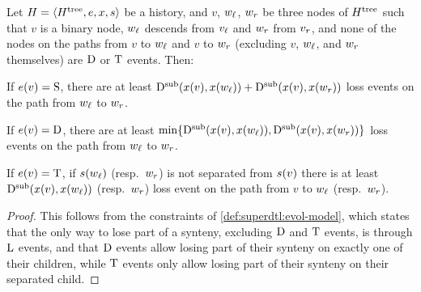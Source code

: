 \begin{lemma}\label{lem:superdtl:history-min-loss}
    Let \(H = \left\langle H^\mathrm{tree}, e, x, s\right\rangle\) be a history, and \(v\), \(w_\mathit{\ell}\), \(w_r\) be three nodes of \(H^\mathrm{tree}\) such that \(v\) is a binary node, \(w_\mathit{\ell}\) descends from \(v_\mathit{\ell}\) and \(w_r\) from \(v_r\), and none of the nodes on the paths from \(v\) to \(w_\mathit{\ell}\) and \(v\) to \(w_r\) (excluding \(v\), \(w_\mathit{\ell}\), and \(w_r\) themselves) are \(\mathrm{D}\) or \(\mathrm{T}\) events.
    Then:
    \begin{condition}
        \item\label{lem:superdtl:history-min-loss-spe}
        If \(e(v) = \mathrm{S}\), there are at least \(\mathrm{D}^\mathrm{sub}(x(v), x(w_\mathit{\ell})) + \mathrm{D}^\mathrm{sub}(x(v), x(w_r))\) loss events on the path from \(w_\mathit{\ell}\) to \(w_r\).
        \item\label{lem:superdtl:history-min-loss-dup}
        If \(e(v) = \mathrm{D}\), there are at least \(\min\{\mathrm{D}^\mathrm{sub}(x(v), x(w_\mathit{\ell})), \mathrm{D}^\mathrm{sub}(x(v), x(w_r))\}\) loss events on the path from \(w_\mathit{\ell}\) to \(w_r\).
        \item\label{lem:superdtl:history-min-loss-hgt}
        If \(e(v) = \mathrm{T}\), if \(s(w_\mathit{\ell})\) (resp.~\(w_r\)) is not separated from \(s(v)\) there is at least \(\mathrm{D}^\mathrm{sub}(x(v), x(w_\mathit{\ell}))\) (resp.~\(w_r\)) loss event on the path from \(v\) to \(w_\mathit{\ell}\) (resp.~\(w_r\)).
    \end{condition}
\end{lemma}
\begin{proof}
    This follows from the constraints of \cref{def:superdtl:evol-model}, which states that the only way to lose part of a synteny, excluding \(\mathrm{D}\) and \(\mathrm{T}\) events, is through \(\mathrm{L}\) events, and that \(\mathrm{D}\) events allow losing part of their synteny on exactly one of their children, while \(\mathrm{T}\) events only allow losing part of their synteny on their separated child.
\end{proof}

